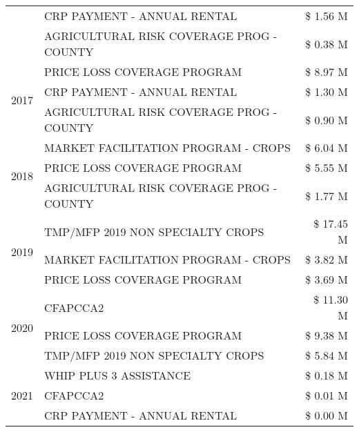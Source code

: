 \begin{tabular}{llr}
 & CRP PAYMENT - ANNUAL RENTAL & \$ 1.56 M \\
 & AGRICULTURAL RISK COVERAGE PROG - COUNTY & \$ 0.38 M \\
\cline{1-3}
\multirow[t]{3}{*}{2017} & PRICE LOSS COVERAGE PROGRAM & \$ 8.97 M \\
 & CRP PAYMENT - ANNUAL RENTAL & \$ 1.30 M \\
 & AGRICULTURAL RISK COVERAGE PROG - COUNTY & \$ 0.90 M \\
\cline{1-3}
\multirow[t]{3}{*}{2018} & MARKET FACILITATION PROGRAM - CROPS & \$ 6.04 M \\
 & PRICE LOSS COVERAGE PROGRAM & \$ 5.55 M \\
 & AGRICULTURAL RISK COVERAGE PROG - COUNTY & \$ 1.77 M \\
\cline{1-3}
\multirow[t]{3}{*}{2019} & TMP/MFP 2019 NON SPECIALTY CROPS & \$ 17.45 M \\
 & MARKET FACILITATION PROGRAM - CROPS & \$ 3.82 M \\
 & PRICE LOSS COVERAGE PROGRAM & \$ 3.69 M \\
\cline{1-3}
\multirow[t]{3}{*}{2020} & CFAPCCA2 & \$ 11.30 M \\
 & PRICE LOSS COVERAGE PROGRAM & \$ 9.38 M \\
 & TMP/MFP 2019 NON SPECIALTY CROPS & \$ 5.84 M \\
\cline{1-3}
\multirow[t]{3}{*}{2021} & WHIP PLUS 3 ASSISTANCE & \$ 0.18 M \\
 & CFAPCCA2 & \$ 0.01 M \\
 & CRP PAYMENT - ANNUAL RENTAL & \$ 0.00 M \\
\cline{1-3}
\bottomrule
\end{tabular}
